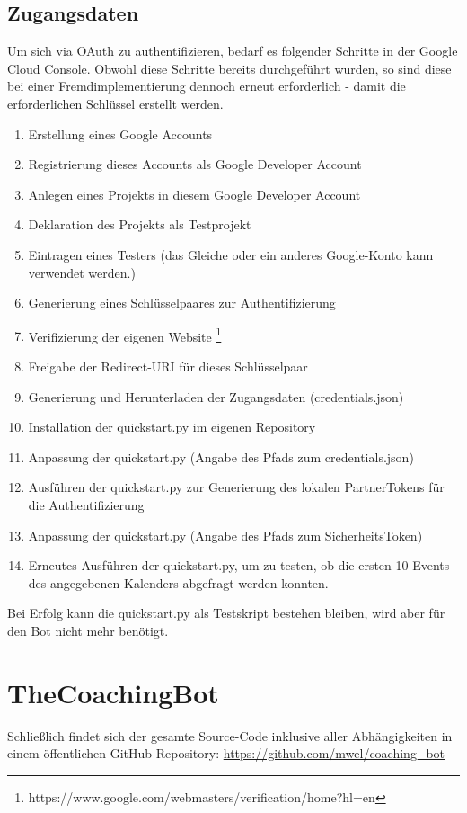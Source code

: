             \subsection{Zugangsdaten}
                Um sich via OAuth zu authentifizieren, bedarf es folgender Schritte in der Google Cloud Console. Obwohl diese Schritte bereits durchgeführt wurden, so sind diese bei einer Fremdimplementierung dennoch erneut erforderlich - damit die erforderlichen Schlüssel erstellt werden. 
                \begin{enumerate}
                    \item Erstellung eines Google Accounts
                    \item Registrierung dieses Accounts als Google Developer Account
                    \item Anlegen eines Projekts in diesem Google Developer Account
                    \item Deklaration des Projekts als Testprojekt
                    \item Eintragen eines Testers (das Gleiche oder ein anderes Google-Konto kann verwendet werden.)
                    \item Generierung eines Schlüsselpaares zur Authentifizierung
                    \item Verifizierung der eigenen Website \footnote{https://www.google.com/webmasters/verification/home?hl=en}
                    \item Freigabe der Redirect-URI für dieses Schlüsselpaar
                    \item Generierung und Herunterladen der Zugangsdaten (credentials.json)
                    \item Installation der quickstart.py im eigenen Repository
                    \item Anpassung der quickstart.py (Angabe des Pfads zum credentials.json)
                    \item Ausführen der quickstart.py zur Generierung des lokalen Partner\-Tokens für die Authentifizierung
                    \item Anpassung der quickstart.py (Angabe des Pfads zum Sicherheits\-Token)
                    \item Erneutes Ausführen der quickstart.py, um zu testen, ob die ersten 10 Events des angegebenen Kalenders abgefragt werden konnten.                    
                \end{enumerate}
                Bei Erfolg kann die quickstart.py als Testskript bestehen bleiben, wird aber für den Bot nicht mehr benötigt.


    \section{TheCoachingBot}
        Schließlich findet sich der gesamte Source-Code inklusive aller Abhängigkeiten in einem öffentlichen GitHub Repository: \url{https://github.com/mwel/coaching_bot}